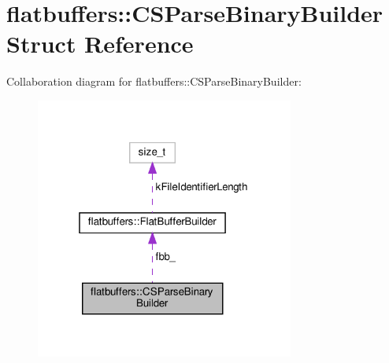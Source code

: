 \hypertarget{structflatbuffers_1_1CSParseBinaryBuilder}{}\section{flatbuffers\+:\+:C\+S\+Parse\+Binary\+Builder Struct Reference}
\label{structflatbuffers_1_1CSParseBinaryBuilder}


Collaboration diagram for flatbuffers\+:\+:C\+S\+Parse\+Binary\+Builder\+:
\nopagebreak
\begin{figure}[H]
\begin{center}
\leavevmode
\includegraphics[width=241pt]{structflatbuffers_1_1CSParseBinaryBuilder__coll__graph}
\end{center}
\end{figure}
